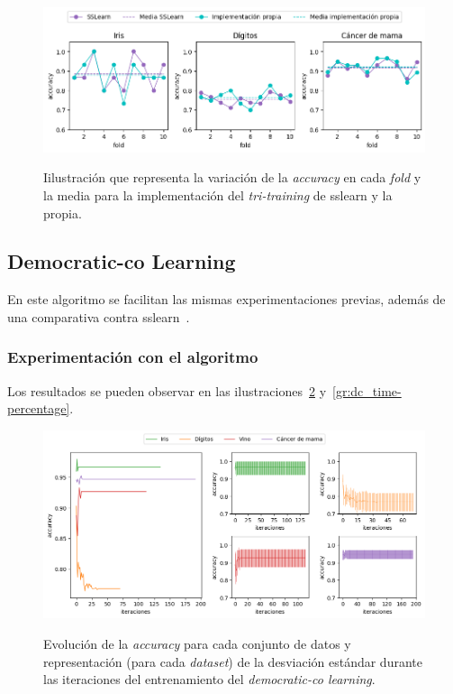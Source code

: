 \begin{figure}[h]
	\caption[\textit{Tri-training}: comparativa contra sslearn]{Iilustración que representa la variación de la \textit{accuracy} en cada \textit{fold} y la media para la implementación del \textit{tri-training} de sslearn y la propia.}
	\centering
	\includegraphics[scale=0.62]{../img/memoria/5_tritraining_sslearn}
	\label{gr:tt_vs_sslearn}
\end{figure}


\subsection{Democratic-co Learning}
\label{democraticco-exp}

En este algoritmo se facilitan las mismas experimentaciones previas, además de una comparativa contra sslearn~\cite{sslearnRepo}.

\subsubsection{Experimentación con el algoritmo}
Los resultados se pueden observar en las ilustraciones~\ref{gr:dc_train-iterations} y~\ref{gr:dc_time-percentage}.

\begin{figure}[h]
	\caption[\textit{Democratic-co}: resultados (iteraciones-entrenamiento)]{Evolución de la \textit{accuracy} para cada conjunto de datos y representación (para cada \textit{dataset}) de la desviación estándar durante las iteraciones del entrenamiento del \textit{democratic-co learning}.}
	\centering
	\includegraphics[scale=0.5]{../img/memoria/5_democraticco_score-iteraciones}
	\label{gr:dc_train-iterations}
\end{figure}

